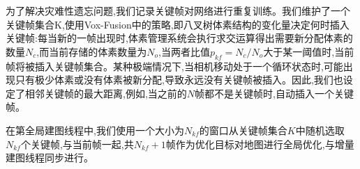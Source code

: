 为了解决灾难性遗忘问题,我们记录关键帧对网络进行重复训练。我们维护了一个关键帧集合K,使用Vox-Fusion中的策略,即八叉树体素结构的变化量决定何时插入关键帧:每当新的一帧出现时,体素管理系统会执行求交运算得出需要新分配体素的数量$N_c$,而当前存储的体素数量为$N_o$,当两者比值$p_{kf}=N_c/N_o$大于某一阈值时,当前帧将被插入关键帧集合。某种极端情况下,当相机移动处于一个循环状态时,可能出现只有极少体素或没有体素被新分配,导致永远没有关键帧被插入。因此,我们也设定了相邻关键帧的最大距离,例如,当之前的$N$帧都不是关键帧时,自动插入一个关键帧。

在第全局建图线程中,我们使用一个大小为$N_{kf}$的窗口从关键帧集合$K$中随机选取$N_{kf}$个关键帧,与当前帧一起,共$N_{kf}+1$帧作为优化目标对地图进行全局优化,与增量建图线程同步进行。
